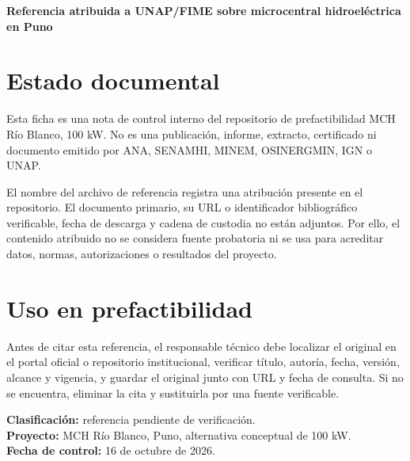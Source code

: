 \documentclass[11pt,a4paper]{article}
\begin{document}
\begin{center}\Large\bfseries\color{navy}Referencia atribuida a UNAP/FIME sobre microcentral hidroeléctrica en Puno\end{center}
\vspace{1em}
\section*{Estado documental}
Esta ficha es una nota de control interno del repositorio de prefactibilidad MCH Río Blanco, 100 kW. No es una publicación, informe, extracto, certificado ni documento emitido por ANA, SENAMHI, MINEM, OSINERGMIN, IGN o UNAP.

El nombre del archivo de referencia registra una atribución presente en el repositorio. El documento primario, su URL o identificador bibliográfico verificable, fecha de descarga y cadena de custodia no están adjuntos. Por ello, el contenido atribuido no se considera fuente probatoria ni se usa para acreditar datos, normas, autorizaciones o resultados del proyecto.

\section*{Uso en prefactibilidad}
Antes de citar esta referencia, el responsable técnico debe localizar el original en el portal oficial o repositorio institucional, verificar título, autoría, fecha, versión, alcance y vigencia, y guardar el original junto con URL y fecha de consulta. Si no se encuentra, eliminar la cita y sustituirla por una fuente verificable.

\vfill
\noindent\textbf{Clasificación:} referencia pendiente de verificación.\\
\textbf{Proyecto:} MCH Río Blanco, Puno, alternativa conceptual de 100 kW.\\
\textbf{Fecha de control:} 16 de octubre de 2026.
\end{document}

